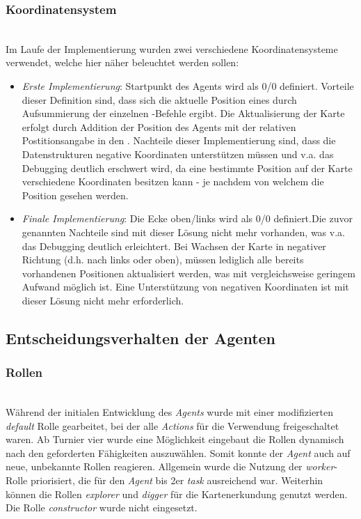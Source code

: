 \subsubsection{Koordinatensystem} ~\\
Im Laufe der Implementierung wurden zwei verschiedene Koordinatensysteme verwendet, welche hier näher beleuchtet werden sollen: 
\begin{itemize}
	\item \textit{Erste Implementierung}: Startpunkt des Agents wird als 0/0 definiert. \newline Vorteile dieser Definition sind, dass sich die aktuelle Position eines \Agents durch Aufsummierung der einzelnen \move-Befehle ergibt. Die Aktualisierung der Karte erfolgt durch Addition der Position des Agents mit der relativen Postitionsangabe in den \Percepts. Nachteile dieser Implementierung sind, dass die Datenstrukturen negative Koordinaten unterstützen müssen und v.a. das Debugging deutlich erschwert wird, da eine bestimmte Position auf der Karte verschiedene Koordinaten besitzen kann - je nachdem von welchem \Agent die Position \glqq{}gesehen\grqq{} werden. 
	\item \textit{Finale Implementierung}: Die Ecke oben/links wird als 0/0 definiert.\newline Die zuvor genannten Nachteile sind mit dieser Lösung nicht mehr vorhanden, was v.a. das Debugging deutlich erleichtert. Bei \glqq{}Wachsen\grqq{} der Karte in negativer Richtung (d.h. nach links oder oben), müssen lediglich alle bereits vorhandenen Positionen aktualisiert werden, was mit vergleichsweise geringem Aufwand möglich ist. Eine Unterstützung von negativen Koordinaten ist mit dieser Lösung nicht mehr erforderlich. 
\end{itemize}

\subsection{Entscheidungsverhalten der Agenten} \label{kap:entscheidungAgenten}

\subsubsection{Rollen} ~\\
Während der initialen Entwicklung des \textit{Agents} wurde mit einer modifizierten \textit{default} Rolle gearbeitet, bei der alle \textit{Actions} für die Verwendung freigeschaltet waren. Ab Turnier vier wurde eine Möglichkeit eingebaut die Rollen dynamisch nach den geforderten Fähigkeiten auszuwählen. 
Somit konnte der \textit{Agent} auch auf neue, unbekannte Rollen reagieren. Allgemein wurde die Nutzung der \textit{worker}-Rolle priorisiert, die für den \textit{Agent} bis 2er \textit{task} ausreichend war. Weiterhin können die Rollen  \textit{explorer} und  \textit{digger} für die Kartenerkundung genutzt werden. Die Rolle \textit{constructor} wurde nicht eingesetzt.

